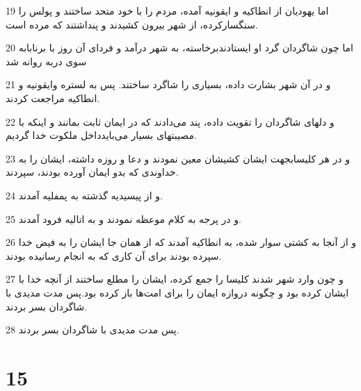 \par 19 اما یهودیان از انطاکیه و ایقونیه آمده، مردم را با خود متحد ساختند و پولس را سنگسارکرده، از شهر بیرون کشیدند و پنداشتند که مرده است.
\par 20 اما چون شاگردان گرد او ایستادندبرخاسته، به شهر درآمد و فردای آن روز با برنابابه سوی دربه روانه شد
\par 21 و در آن شهر بشارت داده، بسیاری را شاگرد ساختند. پس به لستره وایقونیه و انطاکیه مراجعت کردند.
\par 22 و دلهای شاگردان را تقویت داده، پند می‌دادند که در ایمان ثابت بمانند و اینکه با مصیبتهای بسیار می‌بایدداخل ملکوت خدا گردیم.
\par 23 و در هر کلیسابجهت ایشان کشیشان معین نمودند و دعا و روزه داشته، ایشان را به خداوندی که بدو ایمان آورده بودند، سپردند.
\par 24 و از پیسیدیه گذشته به پمفلیه آمدند.
\par 25 و در پرجه به کلام موعظه نمودند و به اتالیه فرود آمدند.
\par 26 و از آنجا به کشتی سوار شده، به انطاکیه آمدند که از همان جا ایشان را به فیض خدا سپرده بودند برای آن کاری که به انجام رسانیده بودند.
\par 27 و چون وارد شهر شدند کلیسا را جمع کرده، ایشان را مطلع ساختند از آنچه خدا با ایشان کرده بود و چگونه دروازه ایمان را برای امت‌ها باز کرده بود.پس مدت مدیدی با شاگردان بسر بردند.
\par 28 پس مدت مدیدی با شاگردان بسر بردند.

\chapter{15}

